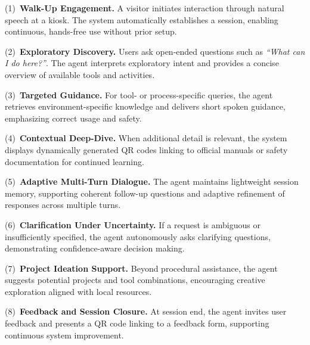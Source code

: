 \documentclass[sigconf]{aamas}
\begin{document}
(1)~\textbf{Walk-Up Engagement.} 
    A visitor initiates interaction through natural speech at a kiosk. The system automatically establishes a session, enabling continuous, hands-free use without prior setup.

(2)~\textbf{Exploratory Discovery.} 
    Users ask open-ended questions such as \emph{``What can I do here?''}. The agent interprets exploratory intent and provides a concise overview of available tools and activities.

(3)~\textbf{Targeted Guidance.} 
    For tool- or process-specific queries, the agent retrieves environment-specific knowledge and delivers short spoken guidance, emphasizing correct usage and safety.

(4)~\textbf{Contextual Deep-Dive.} 
    When additional detail is relevant, the system displays dynamically generated QR codes linking to official manuals or safety documentation for continued learning.

(5)~\textbf{Adaptive Multi-Turn Dialogue.} 
    The agent maintains lightweight session memory, supporting coherent follow-up questions and adaptive refinement of responses across multiple turns.

(6)~\textbf{Clarification Under Uncertainty.} 
    If a request is ambiguous or insufficiently specified, the agent autonomously asks clarifying questions, demonstrating confidence-aware decision making.

(7)~\textbf{Project Ideation Support.} 
    Beyond procedural assistance, the agent suggests potential projects and tool combinations, encouraging creative exploration aligned with local resources.

(8)~\textbf{Feedback and Session Closure.} 
    At session end, the agent invites user feedback and presents a QR code linking to a feedback form, supporting continuous system improvement.
% 
\end{document}
